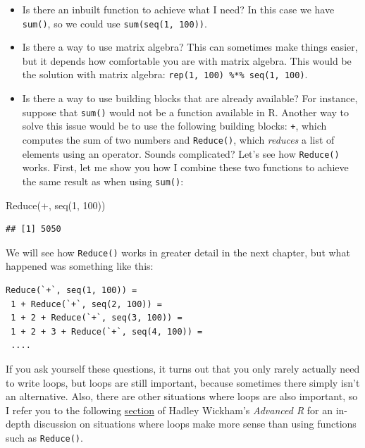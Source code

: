 \documentclass[
]{article}
\newenvironment{Shaded}{\begin{snugshade}}{\end{snugshade}}
\newcommand{\AttributeTok}[1]{\textcolor[rgb]{0.77,0.63,0.00}{#1}}
\newcommand{\DecValTok}[1]{\textcolor[rgb]{0.00,0.00,0.81}{#1}}
\newcommand{\FunctionTok}[1]{\textcolor[rgb]{0.00,0.00,0.00}{#1}}
\newcommand{\NormalTok}[1]{#1}
\newcommand{\StringTok}[1]{\textcolor[rgb]{0.31,0.60,0.02}{#1}}
\providecommand{\tightlist}{%
  \setlength{\itemsep}{0pt}\setlength{\parskip}{0pt}}
\begin{document}
\begin{itemize}
\tightlist
\item
  Is there an inbuilt function to achieve what I need? In this case we have \texttt{sum()}, so we could use \texttt{sum(seq(1,\ 100))}.
\item
  Is there a way to use matrix algebra? This can sometimes make things easier, but it depends how comfortable
  you are with matrix algebra. This would be the solution with matrix algebra: \texttt{rep(1,\ 100)\ \%*\%\ seq(1,\ 100)}.
\item
  Is there a way to use building blocks that are already available? For instance, suppose that \texttt{sum()}
  would not be a function available in R. Another way to solve this issue would be to use the following
  building blocks: \texttt{+}, which computes the sum of two numbers and \texttt{Reduce()}, which \emph{reduces} a list
  of elements using an operator. Sounds complicated? Let's see how \texttt{Reduce()} works. First, let me show you how
  I combine these two functions to achieve the same result as when using \texttt{sum()}:
\end{itemize}

\begin{Shaded}
\begin{Highlighting}[]
\FunctionTok{Reduce}\NormalTok{(}\StringTok{\textasciigrave{}}\AttributeTok{+}\StringTok{\textasciigrave{}}\NormalTok{, }\FunctionTok{seq}\NormalTok{(}\DecValTok{1}\NormalTok{, }\DecValTok{100}\NormalTok{))}
\end{Highlighting}
\end{Shaded}

\begin{verbatim}
## [1] 5050
\end{verbatim}

We will see how \texttt{Reduce()} works in greater detail in the next chapter, but what happened was something like this:

\begin{verbatim}
Reduce(`+`, seq(1, 100)) = 
 1 + Reduce(`+`, seq(2, 100)) = 
 1 + 2 + Reduce(`+`, seq(3, 100)) = 
 1 + 2 + 3 + Reduce(`+`, seq(4, 100)) = 
 ....
\end{verbatim}

If you ask yourself these questions, it turns out that you only rarely actually need to write loops, but loops are
still important, because sometimes there simply isn't an alternative. Also, there are other situations where loops
are also important, so I refer you to the following \href{http://adv-r.had.co.nz/Functionals.html\#functionals-not}{section}
of Hadley Wickham's \emph{Advanced R} for an in-depth discussion on situations where loops make more
sense than using functions such as \texttt{Reduce()}.
\end{document}
